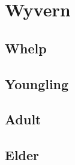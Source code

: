 \section{Wyvern}

\subsection{Whelp}

\subsection{Youngling}

\subsection{Adult}

\subsection{Elder}